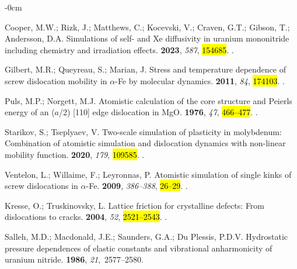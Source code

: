 \documentclass[applsci,article,accept,pdftex,moreauthors]{Definitions/mdpi}
\newcommand{\?}{\stackrel{?}{=}}
\begin{document}
\begin{adjustwidth}{-\extralength}{0cm}
\begin{thebibliography}{999}
Cooper, M.W.; Rizk, J.; Matthews, C.; Kocevski, V.; Craven, G.T.; Gibson, T.;
  Andersson, D.A.
\newblock Simulations of self- and {Xe} diffusivity in uranium mononitride
  including chemistry and irradiation effects.
 {\bf 2023}, {\em 587}, \hl{154685}.
.

Gilbert, M.R.; Queyreau, S.; Marian, J.
\newblock Stress and temperature dependence of screw dislocation mobility in
  {$\alpha$-Fe} by molecular dynamics.
 {\bf
  2011}, {\em 84}, \hl{174103}.
.

Puls, M.P.; Norgett, M.J.
\newblock Atomistic calculation of the core structure and {Peierls} energy of
  an ($a$/2) [110] edge dislocation in {MgO}.
 {\bf 1976}, {\em 47}, \hl{466--477}.
.

Starikov, S.; Tseplyaev, V.
\newblock Two-scale simulation of plasticity in molybdenum: Combination of
  atomistic simulation and dislocation dynamics with non-linear mobility
  function.
 {\bf 2020}, {\em 179}, \hl{109585}.
.

Ventelon, L.; Willaime, F.; Leyronnas, P.
\newblock Atomistic simulation of single kinks of screw dislocations in
  {$\alpha$-Fe}.
 {\bf 2009}, {\em 386--388}, \hl{26--29}.
.

Kresse, O.; Truskinovsky, L.
\newblock Lattice friction for crystalline defects: From dislocations to
  cracks.
 {\bf 2004}, {\em
  52}, \hl{2521--2543}.
.

Salleh, M.D.; Macdonald, J.E.; Saunders, G.A.; Du Plessis, P.D.V.
\newblock Hydrostatic pressure dependences of elastic constants and vibrational
  anharmonicity of uranium nitride.
 {\bf 1986}, {\em 21},~2577--2580.


\end{thebibliography}
\end{adjustwidth}
\end{document}
